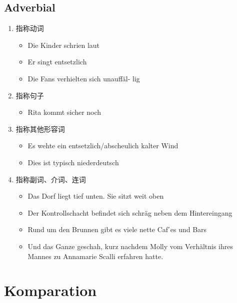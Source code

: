 \documentclass[UTF8]{report}
\begin{document}
\subsection{Adverbial}
\begin{enumerate}
    \item 指称动词
    \begin{itemize}
        \item Die Kinder schrien laut
        \item Er singt entsetzlich
        \item Die Fans verhielten sich unauffäl- lig
    \end{itemize}
    \item 指称句子
    \begin{itemize}
        \item Rita kommt sicher noch
    \end{itemize}
    \item 指称其他形容词
    \begin{itemize}
        \item Es wehte ein entsetzlich/abscheulich kalter Wind
        \item Dies ist typisch niederdeutsch
    \end{itemize}
    \item 指称副词、介词、连词
    \begin{itemize}
        \item Das Dorf liegt tief unten. Sie sitzt weit oben
        \item Der Kontrollschacht befindet sich schräg neben dem Hintereingang
        \item Rund um den Brunnen gibt es viele nette Caf ́es und Bars
        \item Und das Ganze geschah, kurz nachdem Molly vom Verhältnis ihres Mannes zu Annamarie Scalli erfahren hatte.
    \end{itemize}
\end{enumerate}



\section{Komparation}
\end{document}
